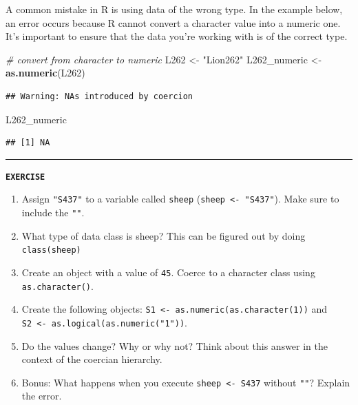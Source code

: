 \documentclass[
]{book}
\newenvironment{Shaded}{\begin{snugshade}}{\end{snugshade}}
\newcommand{\CommentTok}[1]{\textcolor[rgb]{0.56,0.35,0.01}{\textit{#1}}}
\newcommand{\FunctionTok}[1]{\textcolor[rgb]{0.13,0.29,0.53}{\textbf{#1}}}
\newcommand{\NormalTok}[1]{#1}
\newcommand{\OtherTok}[1]{\textcolor[rgb]{0.56,0.35,0.01}{#1}}
\newcommand{\StringTok}[1]{\textcolor[rgb]{0.31,0.60,0.02}{#1}}
\providecommand{\tightlist}{%
  \setlength{\itemsep}{0pt}\setlength{\parskip}{0pt}}
\begin{document}
A common mistake in R is using data of the wrong type. In the example below, an error occurs because R cannot convert a character value into a numeric one. It's important to ensure that the data you're working with is of the correct type.

\begin{Shaded}
\begin{Highlighting}[]
\CommentTok{\# convert from character to numeric}
\NormalTok{L262 }\OtherTok{\textless{}{-}} \StringTok{"Lion262"}
\NormalTok{L262\_numeric }\OtherTok{\textless{}{-}} \FunctionTok{as.numeric}\NormalTok{(L262)}
\end{Highlighting}
\end{Shaded}

\begin{verbatim}
## Warning: NAs introduced by coercion
\end{verbatim}

\begin{Shaded}
\begin{Highlighting}[]
\NormalTok{L262\_numeric}
\end{Highlighting}
\end{Shaded}

\begin{verbatim}
## [1] NA
\end{verbatim}

\begin{center}\rule{0.5\linewidth}{0.5pt}\end{center}

\textbf{\texttt{EXERCISE}}

\begin{enumerate}
\def\labelenumi{\arabic{enumi}.}
\tightlist
\item
  Assign \texttt{"S437"} to a variable called \texttt{sheep} (\texttt{sheep\ \textless{}-\ "S437"}). Make sure to include the \texttt{""}.
\item
  What type of data class is sheep? This can be figured out by doing \texttt{class(sheep)}
\item
  Create an object with a value of \texttt{45}. Coerce to a character class using \texttt{as.character()}.
\item
  Create the following objects: \texttt{S1\ \textless{}-\ as.numeric(as.character(1))} and \texttt{S2\ \textless{}-\ as.logical(as.numeric("1"))}.
\item
  Do the values change? Why or why not? Think about this answer in the context of the coercian hierarchy.
\item
  Bonus: What happens when you execute \texttt{sheep\ \textless{}-\ S437} without \texttt{""}? Explain the error.
\end{enumerate}
\end{document}
